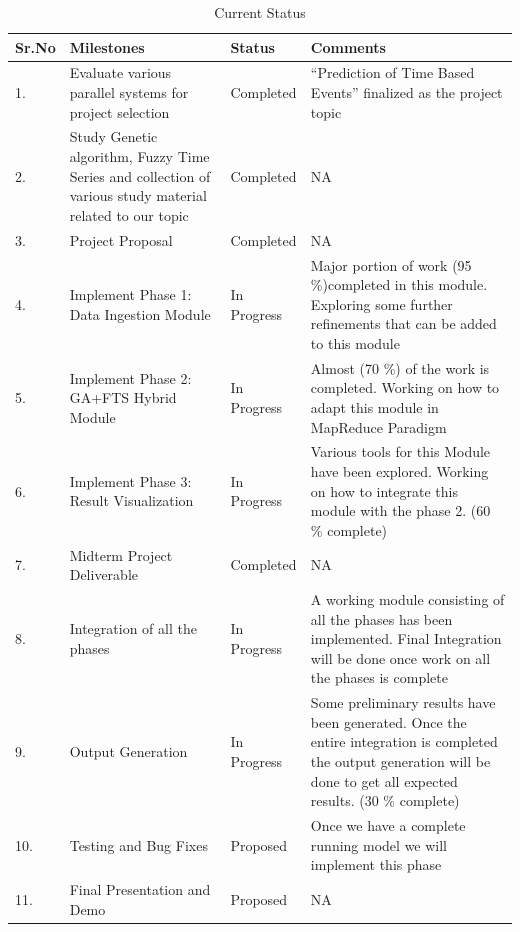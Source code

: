 \documentclass[12pt,journal,compsoc]{IEEEtran}
\begin{document}
\begin{table}[t]
\tiny
  \centering

  
  

\begin{tabularx}{\textwidth}{| l | X | l | X |}
  \hline       
  \rowcolor{lightblue}             
  \textbf{Sr.No} & \textbf{ Milestones} & \textbf{ Status} & \textbf{ Comments} \\
  \hline    
  1. &  Evaluate various parallel systems for project selection & Completed & “Prediction of Time Based Events” finalized as the project topic \\               
  \hline
   2. &   Study Genetic algorithm, Fuzzy Time Series and collection of various study material related to our topic & Completed & NA \\
  \hline  
     3. &   Project Proposal  & Completed & NA \\
  \hline  
  4. &   Implement Phase 1: Data Ingestion Module & In Progress & Major portion of work (95 \%)completed in this module. Exploring some further refinements that can be added to this module \\
  \hline  
  5. & Implement Phase 2: GA+FTS Hybrid Module & In Progress & Almost (70 \%) of the work is  completed. Working on how to adapt this module in MapReduce Paradigm \\
  \hline  
  6. & Implement Phase 3: Result Visualization & In Progress & Various tools for this Module have 
been explored. Working on how to 
integrate this module with the 
phase 2. (60 \% complete) \\
  \hline  
             7. & Midterm Project Deliverable & Completed & NA \\
  \hline  
  8. & Integration of all the phases & In Progress & A working module consisting of all 
the phases has been 
implemented. Final Integration 
will be done once work on all the 
phases is complete \\
  \hline
    9. &   Output Generation & In Progress & Some preliminary results have 
been generated. Once the entire 
integration is completed the 
output generation will be done to 
get all expected results. (30 \% 
complete)
 \\
  \hline
  10. & Testing and Bug Fixes & Proposed & Once we have a complete running model we will implement this phase \\
  \hline
  11. &  Final Presentation and Demo & Proposed & NA \\
  \hline
\end{tabularx}

\caption{Current Status}
\label{curr_stat}
\end{table}
\end{document}
